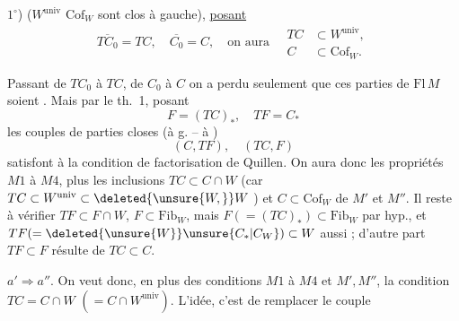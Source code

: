 
$1^\circ$) ($W^{\mathrm{univ}}$  $\mathrm{Cof}_W$ sont clos à gauche), \uline{posant}
\[
 \overline{TC_0}=TC,\quad \overline{C_0}=C,\quad \text{on aura}\quad
 \begin{aligned}TC&\subset W^{\mathrm{univ}},\\ C&\subset\mathrm{Cof}_W.\end{aligned}
\]


Passant de $TC_0$ à $TC$, de $C_0$ à $C$
on a perdu seulement que ces parties de
$\mathrm{Fl}\,M$ soient . Mais par le th.~1, posant
\[
 F=(TC)_*,\quad TF=C_*
\]
les  couples de parties closes (à g. -- à )
\[
 (C,TF),\quad (TC,F)
\]
satisfont à la condition de factorisation de
Quillen. On aura donc les propriétés
$M1$ à $M4$, plus les inclusions
$TC\subset C\cap W$ \unsure{,} (car $TC\subset W^{\mathrm{univ}}\subset\deleted{\unsure{W,}}W$ ) et
$C\subset\mathrm{Cof}_W$ de $M'$ et $M''$. Il reste à vérifier
$TF\subset F\cap W$, $F\subset\mathrm{Fib}_W$, mais $F(=(TC)_*)\subset\mathrm{Fib}_W$ par hyp., et $TF(=\deleted{\unsure{W}}\unsure{C_*|C_W})\subset W$
aussi ; d'autre part $TF\subset F$ résulte
de $TC\subset C$.

$a'\Rightarrow a''$. On veut donc, en plus
des conditions $M1$ à $M4$ et $M',M''$, la
condition $TC=C\cap W$ $(=C\cap W^{\mathrm{univ}})$.
L'idée, c'est de remplacer le couple
